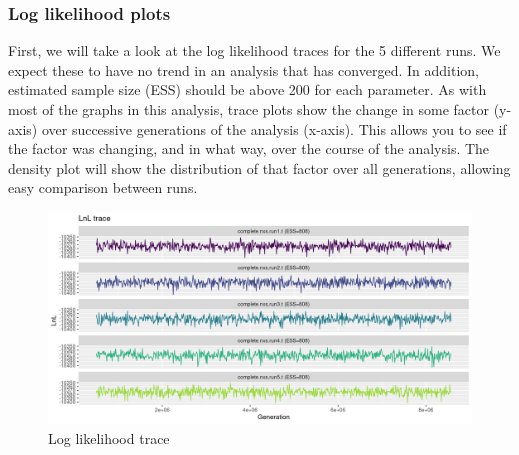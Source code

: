 \documentclass[
]{article}
\newenvironment{Shaded}{\begin{snugshade}}{\end{snugshade}}
\newcommand{\AttributeTok}[1]{\textcolor[rgb]{0.77,0.63,0.00}{#1}}
\newcommand{\DecValTok}[1]{\textcolor[rgb]{0.00,0.00,0.81}{#1}}
\newcommand{\FunctionTok}[1]{\textcolor[rgb]{0.00,0.00,0.00}{#1}}
\newcommand{\NormalTok}[1]{#1}
\newcommand{\SpecialCharTok}[1]{\textcolor[rgb]{0.00,0.00,0.00}{#1}}
\newcommand{\StringTok}[1]{\textcolor[rgb]{0.31,0.60,0.02}{#1}}
\begin{document}
\hypertarget{log-likelihood-plots}{%
\subsubsection{Log likelihood plots}\label{log-likelihood-plots}}

First, we will take a look at the log likelihood traces for the 5
different runs. We expect these to have no trend in an analysis that has
converged. In addition, estimated sample size (ESS) should be above 200
for each parameter. As with most of the graphs in this analysis, trace
plots show the change in some factor (y-axis) over successive
generations of the analysis (x-axis). This allows you to see if the
factor was changing, and in what way, over the course of the analysis.
The density plot will show the distribution of that factor over all
generations, allowing easy comparison between runs.

\begin{Shaded}
\end{Shaded}

\begin{figure}
\centering
\includegraphics{LnL_trace.png}
\caption{Log likelihood trace}
\end{figure}
\end{document}

